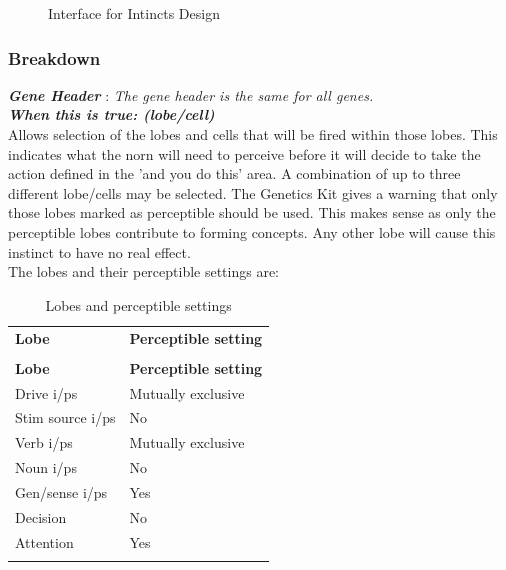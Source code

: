 \documentclass[11pt,twoside,a4paper]{article}
\begin{document}
\begin{figure}[H]
	\centerline {} %
	\caption{Interface for Intincts Design}
	\label{fig:genes_instinct}
\end{figure}

\subsubsection{Breakdown}

\textbf{\textit{Gene Header}} : \emph{The gene header is the same for all genes.}~\\

\textbf{\textit{When this is true: (lobe/cell)}}~\\

Allows selection of the lobes and cells that will be fired within those lobes. This indicates what the norn will need to perceive before it will decide to take the action defined in the 'and you do this' area. A combination of up to three different lobe/cells may be selected. The Genetics Kit gives a warning that only those lobes marked as perceptible should be used. This makes sense as only the perceptible lobes contribute to forming concepts. Any other lobe will cause this instinct to have no real effect.~\\

The lobes and their perceptible settings are:
\begin{longtable}{|p{}|p{}|}
	\hline \rowcolor[gray]{0.50} \multicolumn{2}{|c|}{Lobes and perceptible settings} \\
	\hline \rowcolor[gray]{0.75} \textbf{Lobe} & \textbf{Perceptible setting} \\ \hline
	\endfirsthead
	\hline \rowcolor[gray]{0.50} \multicolumn{2}{|c|}{Lobes and perceptible settings} \\
	\hline \rowcolor[gray]{0.75} \textbf{Lobe} & \textbf{Perceptible setting} \\ \hline
	\endhead
	\hline 
	\endfoot

		Drive i/ps 			&	Mutually exclusive 	\\ \hline
		Stim source i/ps 	&	No 					\\ \hline
		Verb i/ps 			&	Mutually exclusive 	\\ \hline
		Noun i/ps 			&	No 					\\ \hline
		Gen/sense i/ps 		&	Yes 				\\ \hline
		Decision 			&	No 					\\ \hline
		Attention 			&	Yes 				\\ \hline

	\hline
	\caption{Lobes and perceptible settings}
	\label{tab:Lobes_and_perceptible_settings}\\
\end{longtable}~\\~\\
\end{document}
